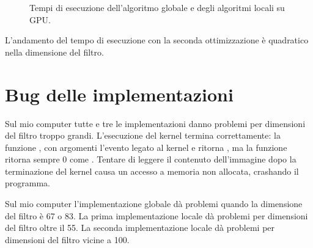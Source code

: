\documentclass[10pt]{myarticle}
\begin{document}
\begin{figure}[tbh]
\centering
{}
	\caption{Tempi di esecuzione dell'algoritmo globale e degli algoritmi locali su GPU.}
	\label{fig:tempi_esecuzione}
\end{figure}

L'andamento del tempo di esecuzione con la seconda ottimizzazione \`e quadratico nella dimensione del filtro.

\section{Bug delle implementazioni}

Sul mio computer tutte e tre le implementazioni danno problemi per dimensioni del filtro troppo grandi.
L'esecuzione del kernel termina correttamente: la funzione , con argomenti l'evento legato al kernel e  ritorna , ma la funzione  ritorna sempre 0 come .
Tentare di leggere il contenuto dell'immagine dopo la terminazione del kernel causa un accesso a memoria non allocata, crashando il programma.

Sul mio computer l'implementazione globale d\`a problemi quando la dimensione del filtro \`e 67 o 83.
La prima implementazione locale d\`a problemi per dimensioni del filtro oltre il 55.
La seconda implementazione locale d\`a problemi per dimensioni del filtro vicine a 100.
\end{document}
